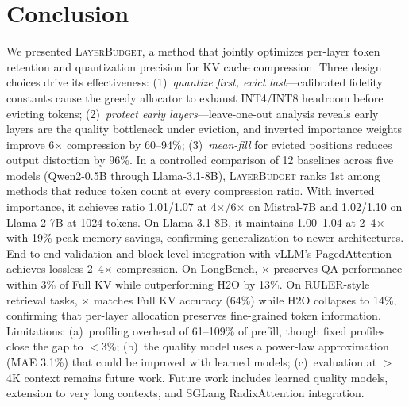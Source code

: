 \documentclass{article}
\newcommand{\layerbudget}{\textsc{LayerBudget}\xspace}
\begin{document}
\section{Conclusion}
\label{sec:conclusion}

We presented \layerbudget, a method that jointly optimizes per-layer token retention and quantization precision for KV cache compression.
Three design choices drive its effectiveness: (1)~\emph{quantize first, evict last}---calibrated fidelity constants cause the greedy allocator to exhaust INT4/INT8 headroom before evicting tokens; (2)~\emph{protect early layers}---leave-one-out analysis reveals early layers are the quality bottleneck under eviction, and inverted importance weights improve 6$\times$ compression by 60--94\%; (3)~\emph{mean-fill} for evicted positions reduces output distortion by 96\%.
In a controlled comparison of 12 baselines across five models (Qwen2-0.5B through Llama-3.1-8B), \layerbudget ranks 1st among methods that reduce token count at every compression ratio.
With inverted importance, it achieves ratio 1.01/1.07 at 4$\times$/6$\times$ on Mistral-7B and 1.02/1.10 on Llama-2-7B at 1024 tokens.
On Llama-3.1-8B, it maintains 1.00--1.04 at 2--4$\times$ with 19\% peak memory savings, confirming generalization to newer architectures.
End-to-end validation and block-level integration with vLLM's PagedAttention achieves lossless 2--4$\times$ compression.
On LongBench, $\times$ preserves QA performance within 3\% of Full KV while outperforming H2O by 13\%.
On RULER-style retrieval tasks, $\times$ matches Full KV accuracy (64\%) while H2O collapses to 14\%, confirming that per-layer allocation preserves fine-grained token information.
Limitations: (a)~profiling overhead of 61--109\% of prefill, though fixed profiles close the gap to $<$3\%; (b)~the quality model uses a power-law approximation (MAE 3.1\%) that could be improved with learned models; (c)~evaluation at $>$4K context remains future work.
Future work includes learned quality models, extension to very long contexts, and SGLang RadixAttention integration.



\end{document}
